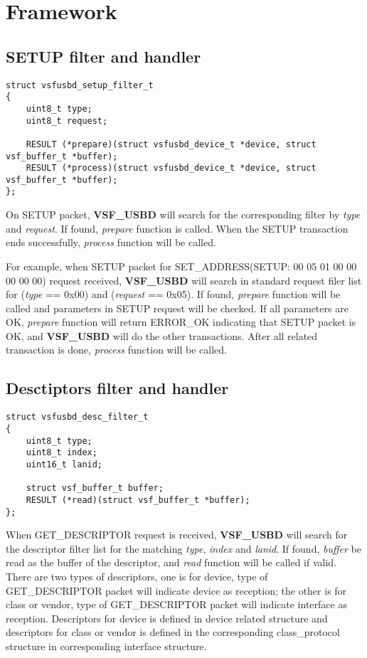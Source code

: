 \documentclass[a4paper,12pt]{book}
\begin{document}
\chapter{Framework}
\minitoc

\newpage
\section{SETUP filter and handler}
\begin{lstlisting}
struct vsfusbd_setup_filter_t
{
	uint8_t type;
	uint8_t request;
	
	RESULT (*prepare)(struct vsfusbd_device_t *device, struct vsf_buffer_t *buffer);
	RESULT (*process)(struct vsfusbd_device_t *device, struct vsf_buffer_t *buffer);
};
\end{lstlisting}
On SETUP packet, \textbf{VSF\_USBD} will search for the corresponding filter by \emph{type} and \emph{request}. If found, \emph{prepare} function is called. When the SETUP transaction ends successfully, \emph{process} function will be called.

For example, when SETUP packet for SET\_ADDRESS(SETUP: 00 05 01 00 00 00 00 00) request received, \textbf{VSF\_USBD} will search in standard request filer list for (\emph{type} == 0x00) and (\emph{request} == 0x05). If found, \emph{prepare} function will be called and parameters in SETUP request will be checked. If all parameters are OK, \emph{prepare} function will return ERROR\_OK indicating that SETUP packet is OK, and \textbf{VSF\_USBD} will do the other transactions. After all related transaction is done, \emph{process} function will be called.

\newpage
\section{Desctiptors filter and handler}
\begin{lstlisting}
struct vsfusbd_desc_filter_t
{
	uint8_t type;
	uint8_t index;
	uint16_t lanid;
	
	struct vsf_buffer_t buffer;
	RESULT (*read)(struct vsf_buffer_t *buffer);
};
\end{lstlisting}
When GET\_DESCRIPTOR request is received, \textbf{VSF\_USBD} will search for the descriptor filter list for the matching \emph{type}, \emph{index} and \emph{lanid}. If found, \emph{buffer} be read as the buffer of the descriptor, and \emph{read} function will be called if valid. There are two types of descriptors, one is for device, type of GET\_DESCRIPTOR packet will indicate device as reception; the other is for class or vendor, type of GET\_DESCRIPTOR packet will indicate interface as reception. Descriptors for device is defined in device related structure and descriptors for class or vendor is defined in the corresponding class\_protocol structure in corresponding interface structure.
\end{document}
